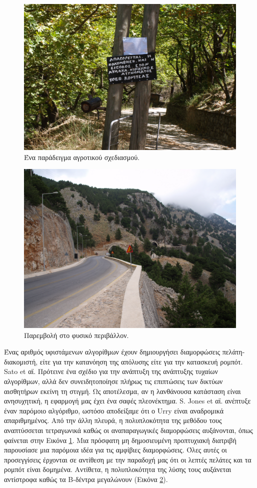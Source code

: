 \documentclass[12pt,a4paper]{extarticle}
\begin{document}
\begin{figure}[h]
	\centering
	\includegraphics[width=0.7\linewidth]{P8161689}
	\caption{Ένα παράδειγμα αγροτικού σχεδιασμού.}
	\label{fig:P8161689}
\end{figure}
\begin{figure}
	\centering
	\includegraphics[width=0.7\linewidth]{P7231856}
	\caption{Παρεμβολή στο φυσικό περιβάλλον.}
	\label{fig:P7231856}
\end{figure}

Ένας αριθμός υφιστάμενων αλγορίθμων έχουν δημιουργήσει διαμορφώσεις πελάτη-διακομιστή, είτε για την κατανόηση της απόλυσης είτε για την κατασκευή ρομπότ. Sato et αϊ. Πρότεινε ένα σχέδιο για την ανάπτυξη της ανάπτυξης τυχαίων αλγορίθμων, αλλά δεν συνειδητοποίησε πλήρως τις επιπτώσεις των δικτύων αισθητήρων εκείνη τη στιγμή. Ως αποτέλεσμα, αν η λανθάνουσα κατάσταση είναι ανησυχητική, η εφαρμογή μας έχει ένα σαφές πλεονέκτημα. S. Jones et αϊ. ανέπτυξε έναν παρόμοιο αλγόριθμο, ωστόσο αποδείξαμε ότι ο Urry είναι αναδρομικά απαριθμημένος. Από την άλλη πλευρά, η πολυπλοκότητα της μεθόδου τους αναπτύσσεται τετραγωνικά καθώς οι αναπαραγωγικές διαμορφώσεις αυξάνονται, όπως φαίνεται στην Εικόνα \ref{fig:P8161689}. Μια πρόσφατη μη δημοσιευμένη προπτυχιακή διατριβή παρουσίασε μια παρόμοια ιδέα για τις αμφίβιες διαμορφώσεις. Όλες αυτές οι προσεγγίσεις έρχονται σε αντίθεση με την παραδοχή μας ότι οι λεπτές πελάτες και τα ρομπότ είναι δομημένα. Αντίθετα, η πολυπλοκότητα της λύσης τους αυξάνεται αντίστροφα καθώς τα Β-δέντρα μεγαλώνουν (Εικόνα \ref{fig:P7231856}).
\end{document}
